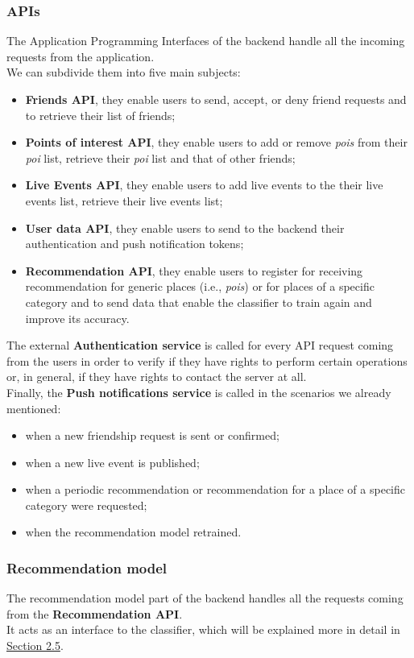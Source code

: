 \documentclass[../../main]{subfiles}
\begin{document}
\subsubsection{APIs}
The Application Programming Interfaces of the backend handle all the incoming requests from the application.\\
We can subdivide them into five main subjects:
\begin{itemize}
    \item \textbf{Friends API}, they enable users to send, accept, or deny friend requests and to retrieve their list of friends;
    \item \textbf{Points of interest API}, they enable users to add or remove \textit{pois} from their \textit{poi} list, retrieve their \textit{poi} list and that of other friends;
    \item \textbf{Live Events API}, they enable users to add live events to the their live events list, retrieve their live events list;
    \item \textbf{User data API}, they enable users to send to the backend their authentication and push notification tokens;
    \item \textbf{Recommendation API}, they enable users to register for receiving recommendation for generic places (i.e., \textit{pois}) or for places of a specific category and to send data that enable the classifier to train again and improve its accuracy.
\end{itemize}
The external \textbf{Authentication service} is called for every API request coming from the users in order to verify if they have rights to perform certain operations or, in general, if they have rights to contact the server at all.\\
Finally, the \textbf{Push notifications service} is called in the scenarios we already mentioned:
\begin{itemize}
    \item when a new friendship request is sent or confirmed;
    \item when a new live event is published;
    \item when a periodic recommendation or recommendation for a place of a specific category were requested;
    \item when the recommendation model retrained.
\end{itemize}

\label{sss:recommendation-model-design}
\subsubsection{Recommendation model}
The recommendation model part of the backend handles all the requests coming from the \textbf{Recommendation API}.\\
It acts as an interface to the classifier, which will be explained more in detail in \hyperref[ss:recommendation-model]{Section 2.5}.
\end{document}
